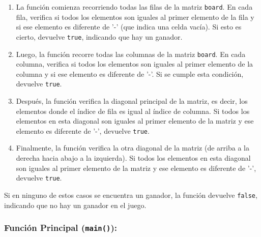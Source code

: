 \begin{enumerate}
    \item La función comienza recorriendo todas las filas de la matriz \texttt{board}. En cada fila, verifica si todos los elementos son iguales al primer elemento de la fila y si ese elemento es diferente de '-' (que indica una celda vacía). Si esto es cierto, devuelve \texttt{true}, indicando que hay un ganador.
    \item Luego, la función recorre todas las columnas de la matriz \texttt{board}. En cada columna, verifica si todos los elementos son iguales al primer elemento de la columna y si ese elemento es diferente de '-'. Si se cumple esta condición, devuelve \texttt{true}.
    \item Después, la función verifica la diagonal principal de la matriz, es decir, los elementos donde el índice de fila es igual al índice de columna. Si todos los elementos en esta diagonal son iguales al primer elemento de la matriz y ese elemento es diferente de '-', devuelve \texttt{true}.
    \item Finalmente, la función verifica la otra diagonal de la matriz (de arriba a la derecha hacia abajo a la izquierda). Si todos los elementos en esta diagonal son iguales al primer elemento de la matriz y ese elemento es diferente de '-', devuelve \texttt{true}.
\end{enumerate}

Si en ninguno de estos casos se encuentra un ganador, la función devuelve \texttt{false}, indicando que no hay un ganador en el juego.

\subsubsection{Función Principal (\texttt{main()}):}

